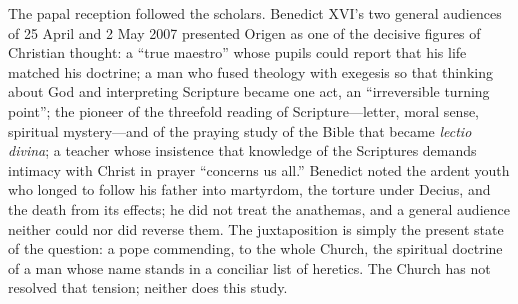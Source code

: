 The papal reception followed the scholars. Benedict XVI's two general
audiences of 25 April and 2 May 2007 presented Origen as one of the
decisive figures of Christian thought: a ``true maestro'' whose pupils
could report that his life matched his doctrine; a man who fused theology
with exegesis so that thinking about God and interpreting Scripture became
one act, an ``irreversible turning point''; the pioneer of the threefold
reading of Scripture---letter, moral sense, spiritual mystery---and of the
praying study of the Bible that became \textit{lectio divina}; a teacher
whose insistence that knowledge of the Scriptures demands intimacy with
Christ in prayer ``concerns us all.'' Benedict noted the ardent youth who
longed to follow his father into martyrdom, the torture under Decius, and
the death from its effects; he did not treat the anathemas, and a general
audience neither could nor did reverse them. The juxtaposition is simply
the present state of the question: a pope commending, to the whole Church,
the spiritual doctrine of a man whose name stands in a conciliar list of
heretics. The Church has not resolved that tension; neither does this
study.
